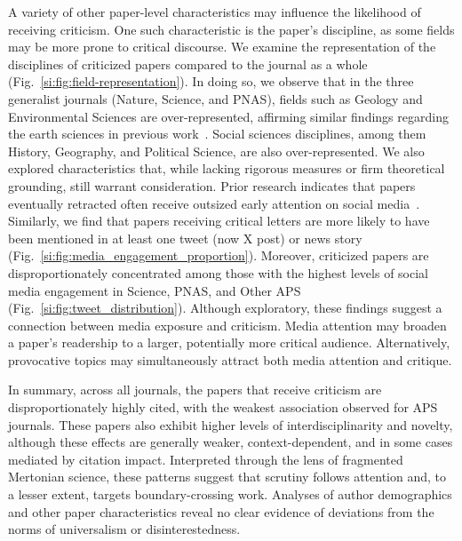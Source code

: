\documentclass[12pt,a4paper]{article}
\numberwithin{equation}{section}
\begin{document}
A variety of other paper-level characteristics may influence the likelihood of receiving criticism. One such characteristic is the paper’s discipline, as some fields may be more prone to critical discourse.
We examine the representation of the disciplines of criticized papers compared to the journal as a whole (Fig.~\ref*{si:fig:field-representation}). 
In doing so, we observe that in the three generalist journals (Nature, Science, and PNAS), fields such as Geology and Environmental Sciences are over-represented, affirming similar findings regarding the earth sciences in previous work~\cite{lamers_2021_disagreement}. 
Social sciences disciplines, among them History, Geography, and Political Science, are also over-represented.
We also explored characteristics that, while lacking rigorous measures or firm theoretical grounding, still warrant consideration.
Prior research indicates that papers eventually retracted often receive outsized early attention on social media~\cite{peng2022retracted, serghiou_2021_attention}. 
Similarly, we find that papers receiving critical letters are more likely to have been mentioned in at least one tweet (now X post) or news story (Fig.~\ref*{si:fig:media_engagement_proportion}).
Moreover, criticized papers are disproportionately concentrated among those with the highest levels of social media engagement in Science, PNAS, and Other APS (Fig.~\ref*{si:fig:tweet_distribution}).
Although exploratory, these findings suggest a connection between media exposure and criticism. Media attention may broaden a paper’s readership to a larger, potentially more critical audience. Alternatively, provocative topics may simultaneously attract both media attention and critique.

In summary, across all journals, the papers that receive criticism are disproportionately highly cited, with the weakest association observed for APS journals.
These papers also exhibit higher levels of interdisciplinarity and novelty, although these effects are generally weaker, context-dependent, and in some cases mediated by citation impact.
Interpreted through the lens of fragmented Mertonian science, these patterns suggest that scrutiny follows attention and, to a lesser extent, targets boundary-crossing work.
Analyses of author demographics and other paper characteristics reveal no clear evidence of deviations from the norms of universalism or disinterestedness.



%
%
\end{document}
